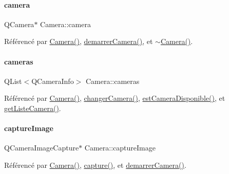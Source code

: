 \paragraph{\texorpdfstring{camera}{camera}}
{\footnotesize\ttfamily Q\+Camera$\ast$ Camera\+::camera\hspace{0.3cm}{\ttfamily [private]}}



Référencé par \hyperlink{class_camera_ae3aa4afd7a3d9ddc2bf710bc74dc293e}{Camera()}, \hyperlink{class_camera_a7eb23e1a5fe67c61f36b8a97ff1f882c}{demarrer\+Camera()}, et \hyperlink{class_camera_ad1897942d0ccf91052386388a497349f}{$\sim$\+Camera()}.

\mbox{\label{class_camera_a3bea5177e857533a53cb94135bee8c6b}} 
\paragraph{\texorpdfstring{cameras}{cameras}}
{\footnotesize\ttfamily Q\+List$<$Q\+Camera\+Info$>$ Camera\+::cameras\hspace{0.3cm}{\ttfamily [private]}}



Référencé par \hyperlink{class_camera_ae3aa4afd7a3d9ddc2bf710bc74dc293e}{Camera()}, \hyperlink{class_camera_a82a0dd06f1802dc0ec0ea8ff6fcbd231}{changer\+Camera()}, \hyperlink{class_camera_afb73ab859802a143a1a00443e396143e}{est\+Camera\+Disponible()}, et \hyperlink{class_camera_ad8a2a21d3701375a553c7c90646c694f}{get\+Liste\+Camera()}.

\mbox{\label{class_camera_a482276c4fd0ba7172670006556322b62}} 
\paragraph{\texorpdfstring{capture\+Image}{captureImage}}
{\footnotesize\ttfamily Q\+Camera\+Image\+Capture$\ast$ Camera\+::capture\+Image\hspace{0.3cm}{\ttfamily [private]}}



Référencé par \hyperlink{class_camera_ae3aa4afd7a3d9ddc2bf710bc74dc293e}{Camera()}, \hyperlink{class_camera_a3ca730dcbd7ea6bfba12931a15066f6c}{capture()}, et \hyperlink{class_camera_a7eb23e1a5fe67c61f36b8a97ff1f882c}{demarrer\+Camera()}.

